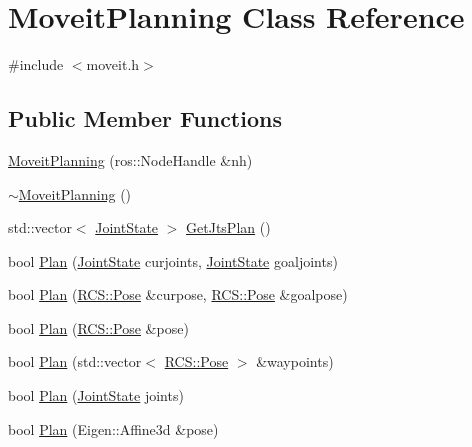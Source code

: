 \hypertarget{classMoveitPlanning}{\section{Moveit\-Planning Class Reference}
\label{classMoveitPlanning}
}


{\ttfamily \#include $<$moveit.\-h$>$}

\subsection*{Public Member Functions}
\begin{DoxyCompactItemize}
\item 
\hyperlink{classMoveitPlanning_a4138e1aed9641e0df587ec2b7e0663fe}{Moveit\-Planning} (ros\-::\-Node\-Handle \&nh)
\item 
\hyperlink{classMoveitPlanning_a0665e6d78bc4ee6c58c58ba1b43f6b7a}{$\sim$\-Moveit\-Planning} ()
\item 
std\-::vector$<$ \hyperlink{RCS_8h_aa4adb93a26caa4dacba9c9614e283245}{Joint\-State} $>$ \hyperlink{classMoveitPlanning_adcd57dfed95d3628cffbe5b88f0896cf}{Get\-Jts\-Plan} ()
\item 
bool \hyperlink{classMoveitPlanning_a37dd79bdbcb114884100bd68b5f107b7}{Plan} (\hyperlink{RCS_8h_aa4adb93a26caa4dacba9c9614e283245}{Joint\-State} curjoints, \hyperlink{RCS_8h_aa4adb93a26caa4dacba9c9614e283245}{Joint\-State} goaljoints)
\item 
bool \hyperlink{classMoveitPlanning_a322c58a642f7c8f20f6692d1f204a319}{Plan} (\hyperlink{namespaceRCS_aa07e45d8a50e30064283d2b38087f999}{R\-C\-S\-::\-Pose} \&curpose, \hyperlink{namespaceRCS_aa07e45d8a50e30064283d2b38087f999}{R\-C\-S\-::\-Pose} \&goalpose)
\item 
bool \hyperlink{classMoveitPlanning_a1c053664491e65b04a84651a93e6c9a7}{Plan} (\hyperlink{namespaceRCS_aa07e45d8a50e30064283d2b38087f999}{R\-C\-S\-::\-Pose} \&pose)
\item 
bool \hyperlink{classMoveitPlanning_a133bf8ecef57cc08a01cddb474d5baa7}{Plan} (std\-::vector$<$ \hyperlink{namespaceRCS_aa07e45d8a50e30064283d2b38087f999}{R\-C\-S\-::\-Pose} $>$ \&waypoints)
\item 
bool \hyperlink{classMoveitPlanning_a21c7727e0906a6ed2e24a31165ed3ba6}{Plan} (\hyperlink{RCS_8h_aa4adb93a26caa4dacba9c9614e283245}{Joint\-State} joints)
\item 
bool \hyperlink{classMoveitPlanning_a535856f4f406cb7d2f89c0bd03618109}{Plan} (Eigen\-::\-Affine3d \&pose)

\end{DoxyCompactItemize}
